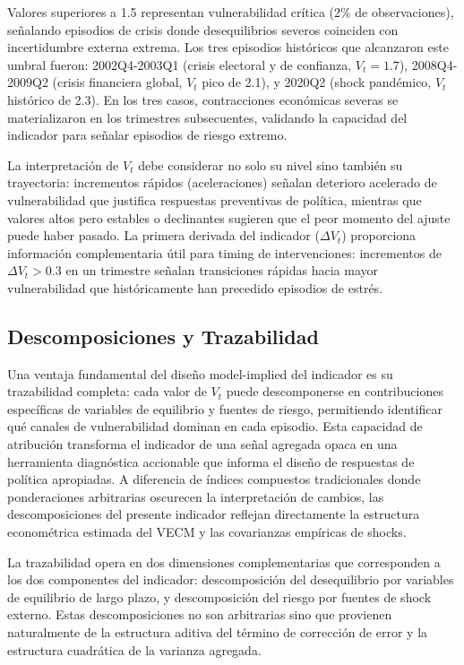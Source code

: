 \documentclass[3p,11pt,draft,natbib=false]{elsarticle}
\begin{document}
Valores superiores a 1.5 representan vulnerabilidad crítica (2\% de observaciones), señalando episodios de crisis donde desequilibrios severos coinciden con incertidumbre externa extrema. Los tres episodios históricos que alcanzaron este umbral fueron: 2002Q4-2003Q1 (crisis electoral y de confianza, $V_t = 1.7$), 2008Q4-2009Q2 (crisis financiera global, $V_t$ pico de 2.1), y 2020Q2 (shock pandémico, $V_t$ histórico de 2.3). En los tres casos, contracciones económicas severas se materializaron en los trimestres subsecuentes, validando la capacidad del indicador para señalar episodios de riesgo extremo.

La interpretación de $V_t$ debe considerar no solo su nivel sino también su trayectoria: incrementos rápidos (aceleraciones) señalan deterioro acelerado de vulnerabilidad que justifica respuestas preventivas de política, mientras que valores altos pero estables o declinantes sugieren que el peor momento del ajuste puede haber pasado. La primera derivada del indicador ($\Delta V_t$) proporciona información complementaria útil para timing de intervenciones: incrementos de $\Delta V_t > 0.3$ en un trimestre señalan transiciones rápidas hacia mayor vulnerabilidad que históricamente han precedido episodios de estrés.
\subsection{Descomposiciones y Trazabilidad}
\label{sec:descomposiciones}

Una ventaja fundamental del diseño model-implied del indicador es su trazabilidad completa: cada valor de $V_t$ puede descomponerse en contribuciones específicas de variables de equilibrio y fuentes de riesgo, permitiendo identificar qué canales de vulnerabilidad dominan en cada episodio. Esta capacidad de atribución transforma el indicador de una señal agregada opaca en una herramienta diagnóstica accionable que informa el diseño de respuestas de política apropiadas. A diferencia de índices compuestos tradicionales donde ponderaciones arbitrarias oscurecen la interpretación de cambios, las descomposiciones del presente indicador reflejan directamente la estructura econométrica estimada del VECM y las covarianzas empíricas de shocks.

La trazabilidad opera en dos dimensiones complementarias que corresponden a los dos componentes del indicador: descomposición del desequilibrio por variables de equilibrio de largo plazo, y descomposición del riesgo por fuentes de shock externo. Estas descomposiciones no son arbitrarias sino que provienen naturalmente de la estructura aditiva del término de corrección de error y la estructura cuadrática de la varianza agregada.
\end{document}
